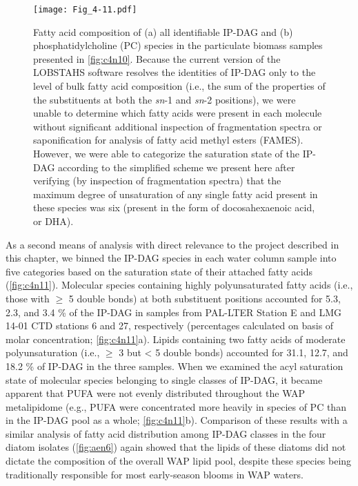\begin{figure}[!p]
\centering
\texttt{[image: Fig\_4-11.pdf]}
\caption[Fatty acid composition of IP-DAG in the sample presented in \autoref{fig:c4n10}]{Fatty acid composition of (a) all identifiable IP-DAG and (b) phosphatidylcholine (PC) species in the particulate biomass samples presented in \autoref{fig:c4n10}. Because the current version of the LOBSTAHS software resolves the identities of IP-DAG only to the level of bulk fatty acid composition (i.e., the sum of the properties of the substituents at both the \emph{sn}-1 and \emph{sn}-2 positions), we were unable to determine which fatty acids were present in each molecule without significant additional inspection of fragmentation spectra or saponification for analysis of fatty acid methyl esters (FAMES). However, we were able to categorize the saturation state of the IP-DAG according to the simplified scheme we present here after verifying (by inspection of fragmentation spectra) that the maximum degree of unsaturation of any single fatty acid present in these species was six (present in the form of docosahexaenoic acid, or DHA).}
\label{fig:c4n11}
\end{figure}

As a second means of analysis with direct relevance to the project described in this chapter, we binned the IP-DAG species in each water column sample into five categories based on the saturation state of their attached fatty acids (\autoref{fig:c4n11}). Molecular species containing highly polyunsaturated fatty acids (i.e., those with $\geq$ 5 double bonds) at both substituent positions accounted for 5.3, 2.3, and 3.4 \% of the IP-DAG in samples from PAL-LTER Station E and LMG 14-01 CTD stations 6 and 27, respectively (percentages calculated on basis of molar concentration; \autoref{fig:c4n11}a). Lipids containing two fatty acids of moderate polyunsaturation (i.e., $\geq$ 3 but \textless{} 5 double bonds) accounted for 31.1, 12.7, and 18.2 \% of IP-DAG in the three samples. When we examined the acyl saturation state of molecular species belonging to single classes of IP-DAG, it became apparent that PUFA were not evenly distributed throughout the WAP metalipidome (e.g., PUFA were concentrated more heavily in species of PC than in the IP-DAG pool as a whole; \autoref{fig:c4n11}b). Comparison of these results with a similar analysis of fatty acid distribution among IP-DAG classes in the four diatom isolates (\autoref{fig:aen6}) again showed that the lipids of these diatoms did not dictate the composition of the overall WAP lipid pool, despite these species being traditionally responsible for most early-season blooms in WAP waters.


